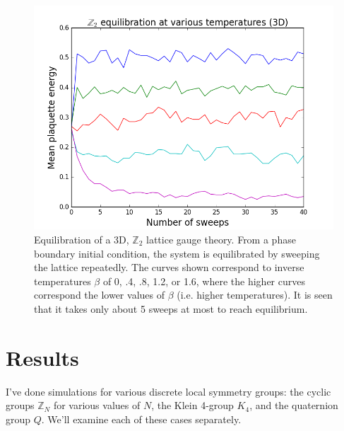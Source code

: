 \documentclass[9pt,twocolumn,twoside]{article}
\begin{document}
\begin{figure}[h!]
	\begin{centering}
	\includegraphics[width=\columnwidth]{equilibration}
	\caption[$\mathbb{Z}_2$ lattice gauge theory phase diagram for a 3D lattice.]{Equilibration of a 3D, $\mathbb{Z}_2$ lattice gauge theory.  From a phase boundary initial condition, the system is equilibrated by sweeping the lattice repeatedly.  The curves shown correspond to inverse temperatures $\beta$ of 0, .4, .8, 1.2, or 1.6, where the higher curves correspond the lower values of $\beta$ (i.e. higher temperatures).  It is seen that it takes only about 5 sweeps at most to reach equilibrium.}
	\label{equilibration}
	\end{centering}
\end{figure}

\section{Results}
I've done simulations for various discrete local symmetry groups: the cyclic groups $\mathbb{Z}_N$ for various values of $N$, the Klein 4-group $K_4$, and the quaternion group $Q$.  We'll examine each of these cases separately.
\end{document}
